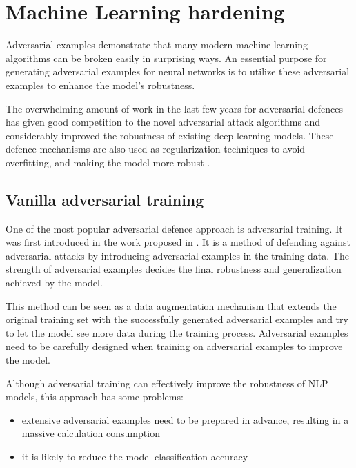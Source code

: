 \section{Machine Learning hardening}\label{sec:ml-hardening}
Adversarial examples demonstrate that many modern machine learning algorithms can be broken easily in surprising ways. 
An essential purpose for generating adversarial examples for neural networks is to utilize these adversarial examples to enhance the model's robustness.

The overwhelming amount of work in the last few years for adversarial defences has given good competition to the novel adversarial attack algorithms and considerably improved the robustness of existing deep learning models. These defence mechanisms are also used as regularization techniques to avoid overfitting, and making the model more robust \cite{https://doi.org/10.48550/arxiv.2203.06414}.

\subsection{Vanilla adversarial training}\label{subsec:adversarial-training}
One of the most popular adversarial defence approach is adversarial training.
It was first introduced in the work proposed in \cite{goodfellow2014explaining}. 
It is a method of defending against adversarial attacks by introducing adversarial examples in the training data. 
The strength of adversarial examples decides the final robustness and generalization achieved by the model.

This method can be seen as a data augmentation mechanism that extends the original training set with the successfully generated adversarial examples and try to let the model see more data during the training process.
Adversarial examples need to be carefully designed when training on adversarial examples to improve the model.

Although adversarial training can effectively improve the robustness of NLP models, this approach has some problems: 
\begin{itemize}
    \item extensive adversarial examples need to be prepared in advance, resulting in a massive calculation consumption
    \item it is likely to reduce the model classification accuracy
\end{itemize}

